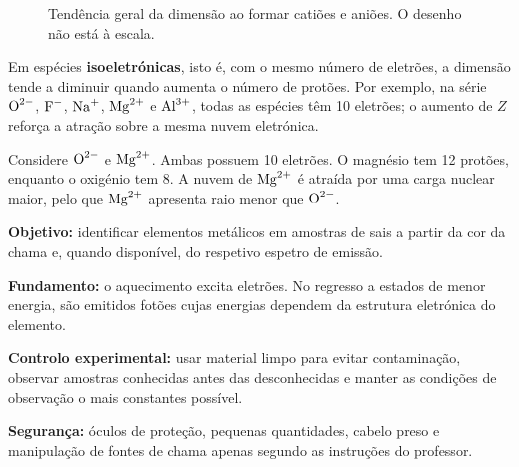 \documentclass[11pt,a4paper,oneside]{book}
\begin{document}
\begin{figure}[H]
\centering
{}
\caption{Tendência geral da dimensão ao formar catiões e aniões. O desenho não está à escala.}
\end{figure}

Em espécies \textbf{isoeletrónicas}, isto é, com o mesmo número de eletrões, a dimensão tende a diminuir quando aumenta o número de protões. Por exemplo, na série $\ce{O^{2-}}$, $\ce{F^-}$, $\ce{Na+}$, $\ce{Mg^{2+}}$ e $\ce{Al^{3+}}$, todas as espécies têm 10 eletrões; o aumento de $Z$ reforça a atração sobre a mesma nuvem eletrónica.

\begin{exemplo}[title={Exemplo resolvido -- comparar raios de espécies isoeletrónicas}]
Considere $\ce{O^{2-}}$ e $\ce{Mg^{2+}}$. Ambas possuem 10 eletrões. O magnésio tem 12 protões, enquanto o oxigénio tem 8. A nuvem de $\ce{Mg^{2+}}$ é atraída por uma carga nuclear maior, pelo que $\ce{Mg^{2+}}$ apresenta raio menor que $\ce{O^{2-}}$.
\end{exemplo}

\begin{atividade}[title=AL 1.2 -- Teste de chama]
\textbf{Objetivo:} identificar elementos metálicos em amostras de sais a partir da cor da chama e, quando disponível, do respetivo espetro de emissão.

\textbf{Fundamento:} o aquecimento excita eletrões. No regresso a estados de menor energia, são emitidos fotões cujas energias dependem da estrutura eletrónica do elemento.

\textbf{Controlo experimental:} usar material limpo para evitar contaminação, observar amostras conhecidas antes das desconhecidas e manter as condições de observação o mais constantes possível.

\textbf{Segurança:} óculos de proteção, pequenas quantidades, cabelo preso e manipulação de fontes de chama apenas segundo as instruções do professor.
\end{atividade}
\end{document}
